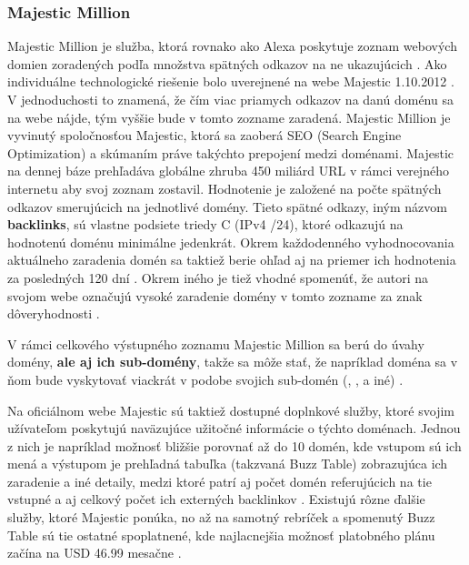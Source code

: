\subsubsection{Majestic Million}

Majestic Million je služba, ktorá rovnako ako Alexa poskytuje zoznam webových domien zoradených podľa množstva spätných odkazov na ne ukazujúcich \cite{majestic-million-homepage}\cite{majestic-million-ranking}.
Ako individuálne technologické riešenie bolo uverejnené na webe Majestic 1.10.2012 \cite{majestic-million-publication}.
V jednoduchosti to znamená, že čím viac priamych odkazov na danú doménu sa na webe nájde, tým vyššie bude v tomto zozname zaradená. 
Majestic Million je vyvinutý spoločnosťou Majestic, ktorá sa zaoberá SEO (Search Engine Optimization) a skúmaním práve takýchto prepojení medzi doménami.
Majestic na dennej báze prehľadáva globálne zhruba 450 miliárd URL v rámci verejného internetu aby svoj zoznam zostavil. 
Hodnotenie je založené na počte spätných odkazov smerujúcich na jednotlivé domény. Tieto spätné odkazy, iným názvom \textbf{backlinks}, sú vlastne podsiete triedy C (IPv4 /24), ktoré odkazujú
na hodnotenú doménu minimálne jedenkrát.
Okrem každodenného vyhodnocovania aktuálneho zaradenia domén sa taktiež berie ohľad aj na priemer ich hodnotenia za posledných 120 dní \cite{tranco-methodology}.
Okrem iného je tiež vhodné spomenúť, že autori na svojom webe označujú vysoké zaradenie domény v tomto zozname za znak dôveryhodnosti \cite{majestic-million-homepage}.

V rámci celkového výstupného zoznamu Majestic Million sa berú do úvahy domény, \textbf{ale aj ich sub-domény}, takže sa môže stať, že napríklad doména  
sa v ňom bude vyskytovať viackrát v podobe svojich sub-domén (, ,  a iné) \cite{majestic-million-sub-domain-filtered}.

Na oficiálnom webe Majestic sú taktiež dostupné doplnkové služby, ktoré svojim užívateľom poskytujú naväzujúce užitočné informácie o týchto doménach. 
Jednou z nich je napríklad možnosť bližšie porovnať až do 10 domén, kde vstupom sú ich mená a výstupom je prehľadná tabuľka (takzvaná Buzz Table) zobrazujúca ich zaradenie a iné detaily, medzi ktoré patrí aj počet domén
referujúcich na tie vstupné a aj celkový počet ich externých backlinkov \cite{majestic-million-homepage}.
Existujú rôzne ďalšie služby, ktoré Majestic ponúka, no až na samotný rebríček a spomenutý Buzz Table sú tie ostatné spoplatnené, kde najlacnejšia možnosť platobného plánu začína na USD 46.99 mesačne \cite{majestic-million-pricing}.

